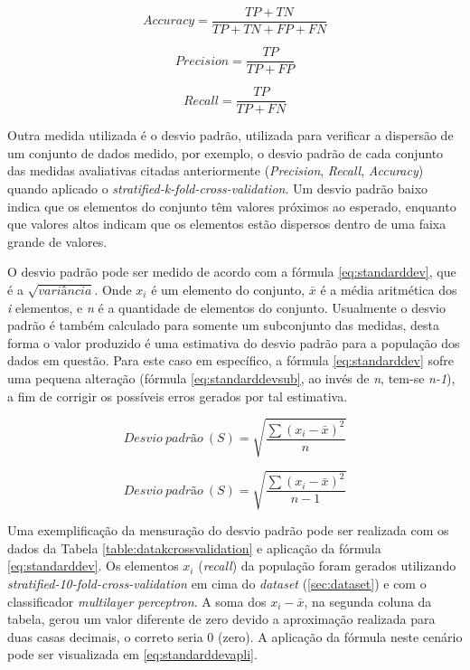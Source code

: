 \begin{equation} 
  Accuracy = \frac{TP+TN}{TP+TN+FP+FN} 
  \label{eq:accuracy}
\end{equation}

\begin{equation} 
  Precision = \frac{TP}{TP+FP}
  \label{eq:precision}
\end{equation}

\begin{equation} 
  Recall = \frac{TP}{TP+FN} 
  \label{eq:recall}
\end{equation}

Outra medida utilizada é o desvio padrão, utilizada para verificar a dispersão de um conjunto de dados medido, por exemplo, o desvio padrão de cada conjunto das medidas avaliativas citadas anteriormente (\textit{Precision}, \textit{Recall}, \textit{Accuracy}) quando aplicado o \textit{stratified-k-fold-cross-validation}. Um desvio padrão baixo indica que os elementos do conjunto têm valores próximos ao esperado, enquanto que valores altos indicam que os elementos estão dispersos dentro de uma faixa grande de valores.\cite{Kerr:2002}\cite{Bland:1996}

O desvio padrão pode ser medido de acordo com a fórmula \ref{eq:standarddev}, que é a $\sqrt{variância}$. Onde $x_{i}$ é um elemento do conjunto, $\bar{x}$ é a média aritmética dos \textit{i} elementos, e \textit{n} é a quantidade de elementos do conjunto. Usualmente o desvio padrão é também calculado para somente um subconjunto das medidas, desta forma o valor produzido é uma estimativa do desvio padrão para a população dos dados em questão. Para este caso em específico, a fórmula \ref{eq:standarddev} sofre uma pequena alteração (fórmula \ref{eq:standarddevsub}, ao  invés de \textit{n}, tem-se \textit{n-1}), a fim de corrigir os possíveis erros gerados por tal estimativa.\cite{Kerr:2002}

\begin{equation} 
  Desvio~padrão~(S) = \sqrt{\frac{\sum{(x_{i}-\bar{x})^2}}{n}} 
  \label{eq:standarddev}
\end{equation}

\begin{equation} 
  Desvio~padrão~(S) = \sqrt{\frac{\sum{(x_{i}-\bar{x})^2}}{n-1}} 
  \label{eq:standarddevsub}
\end{equation}

Uma exemplificação da mensuração do desvio padrão pode ser realizada com os dados da Tabela \ref{table:datakcrossvalidation} e aplicação da fórmula \ref{eq:standarddev}. Os elementos \textit{$x_{i}$} (\textit{recall}) da população foram gerados utilizando \textit{stratified-10-fold-cross-validation} em cima do \textit{dataset} (\ref{sec:dataset}) e com o classificador \textit{multilayer perceptron}. A soma dos \textit{$x_{i}-\bar{x}$}, na segunda coluna da tabela, gerou um valor diferente de zero devido a aproximação realizada para duas casas decimais, o correto seria 0 (zero). A aplicação da fórmula neste cenário pode ser visualizada em \ref{eq:standarddevapli}.

